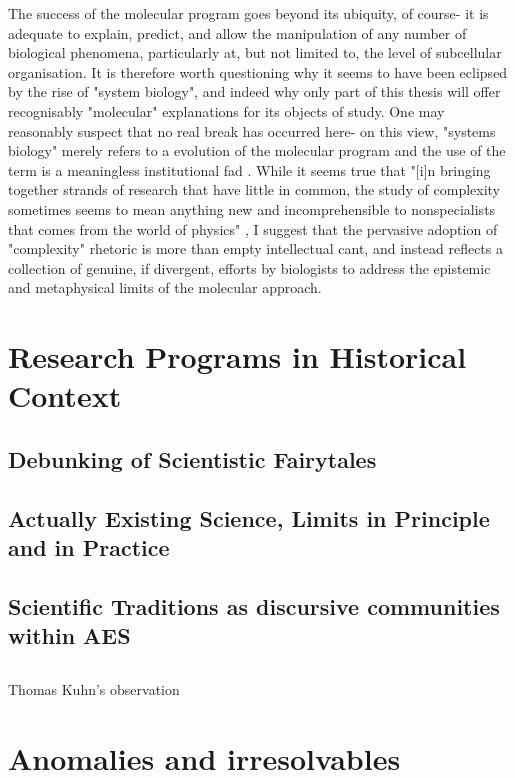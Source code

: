 The success of the molecular program goes beyond its ubiquity, of course- it is adequate to explain, predict, and allow the manipulation of any number of biological phenomena, particularly at, but not limited to, the level of subcellular organisation. It is therefore worth questioning why it seems to have been eclipsed by the rise of "system biology", and indeed why only part of this thesis will offer recognisably "molecular" explanations for its objects of study. One may reasonably suspect that no real break has occurred here- on this view, "systems biology" merely refers to a evolution of the molecular program and the use of the term is a meaningless institutional fad \cite{Morange2008}. While it seems true that "[i]n bringing together strands of research that have little in common, the study of complexity sometimes seems to mean anything new and incomprehensible to nonspecialists that comes from the world of physics" \cite{Morange2003}, I suggest that the pervasive adoption of "complexity" rhetoric is more than empty intellectual cant, and instead reflects a collection of genuine, if divergent, efforts by biologists to address the epistemic and metaphysical limits of the molecular approach.

\section {Research Programs in Historical Context}

\subsection {Debunking of Scientistic Fairytales}

\subsection {Actually Existing Science, Limits in Principle and in Practice}

\subsection {Scientific Traditions as discursive communities within AES}

\subsection {}

Thomas Kuhn's observation

\section{Anomalies and irresolvables}

